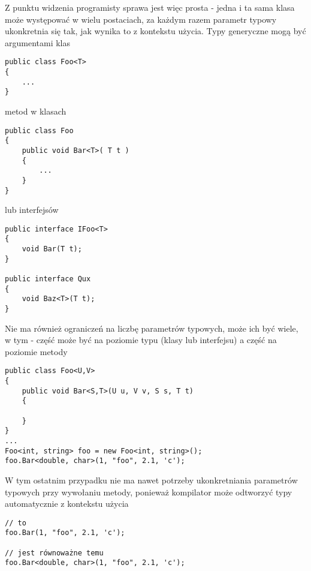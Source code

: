 Z punktu widzenia programisty sprawa jest więc prosta - jedna i ta sama klasa może występować w wielu postaciach, za każdym
razem parametr typowy ukonkretnia się tak, jak wynika to z kontekstu użycia. Typy generyczne mogą być argumentami klas

\begin{scriptsize}
\begin{verbatim}
public class Foo<T>
{
    ...
}
\end{verbatim}
\end{scriptsize}

metod w klasach 

\begin{scriptsize}
\begin{verbatim}
public class Foo
{
    public void Bar<T>( T t )
    {
        ...
    }
}
\end{verbatim}
\end{scriptsize}

lub interfejsów

\begin{scriptsize}
\begin{verbatim}
public interface IFoo<T>
{
    void Bar(T t);
}

public interface Qux
{
    void Baz<T>(T t);
}
\end{verbatim}
\end{scriptsize}

Nie ma również ograniczeń na liczbę parametrów typowych, może ich być wiele, w tym - część może być na poziomie typu
(klasy lub interfejsu) a część na poziomie metody

\begin{scriptsize}
\begin{verbatim}
public class Foo<U,V>
{
    public void Bar<S,T>(U u, V v, S s, T t)
    {

    }
}
...
Foo<int, string> foo = new Foo<int, string>();
foo.Bar<double, char>(1, "foo", 2.1, 'c');
\end{verbatim}
\end{scriptsize}

W tym ostatnim przypadku nie ma nawet potrzeby ukonkretniania parametrów typowych przy wywołaniu metody,
ponieważ kompilator może odtworzyć typy automatycznie z kontekstu użycia

\begin{scriptsize}
\begin{verbatim}
// to
foo.Bar(1, "foo", 2.1, 'c');

// jest równoważne temu
foo.Bar<double, char>(1, "foo", 2.1, 'c');
\end{verbatim}
\end{scriptsize}

